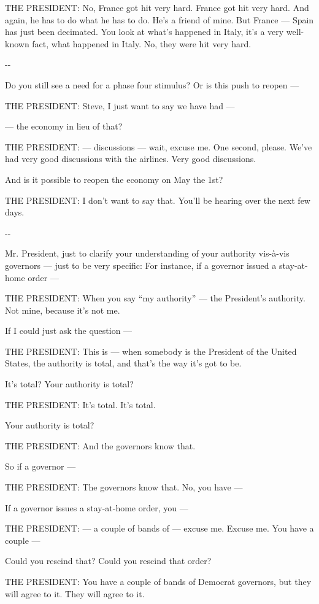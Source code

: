 THE PRESIDENT: No, France got hit very hard. France got hit very hard.
And again, he has to do what he has to do. He's a friend of mine. But
France --- Spain has just been decimated. You look at what's happened in
Italy, it's a very well-known fact, what happened in Italy. No, they
were hit very hard.

-\/-

Do you still see a need for a phase four stimulus? Or is this push to
reopen ---

THE PRESIDENT: Steve, I just want to say we have had ---

--- the economy in lieu of that?

THE PRESIDENT: --- discussions --- wait, excuse me. One second, please.
We've had very good discussions with the airlines. Very good
discussions.

And is it possible to reopen the economy on May the 1st?

THE PRESIDENT: I don't want to say that. You'll be hearing over the next
few days.

-\/-

Mr. President, just to clarify your understanding of your authority
vis-à-vis governors --- just to be very specific: For instance, if a
governor issued a stay-at-home order ---

THE PRESIDENT: When you say ``my authority'' --- the President's
authority. Not mine, because it's not me.

If I could just ask the question ---

THE PRESIDENT: This is --- when somebody is the President of the United
States, the authority is total, and that's the way it's got to be.

It's total? Your authority is total?

THE PRESIDENT: It's total. It's total.

Your authority is total?

THE PRESIDENT: And the governors know that.

So if a governor ---

THE PRESIDENT: The governors know that. No, you have ---

If a governor issues a stay-at-home order, you ---

THE PRESIDENT: --- a couple of bands of --- excuse me. Excuse me. You
have a couple ---

Could you rescind that? Could you rescind that order?

THE PRESIDENT: You have a couple of bands of Democrat governors, but
they will agree to it. They will agree to it.

